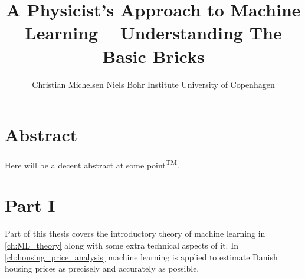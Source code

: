 \documentclass[a4paper, twoside, nobib]{tufte-book}
\title[A Physicist's Approach To Machine Learning -- Understanding The Basic Bricks]{A Physicist's \newline \noindent 
       Approach to \newline \noindent 
       Machine Learning \newline \noindent
       --  \newline \noindent
       Understanding  \newline \noindent
       The Basic Bricks}
\author[Christian Michelsen]{\newline \noindent 
        Christian Michelsen \newline \noindent 
        Niels Bohr Institute \newline \noindent 
        University of Copenhagen \newline }
\newcommand{\RNum}[1]{\uppercase\expandafter{\romannumeral #1\relax}}
\begin{document}
\begin{titlepage}
  
\end{titlepage}



\chapter*{Abstract}
Here will be a decent abstract at some point\textsuperscript{TM}.


\cleardoublepage
{}
{}

\tableofcontents

\cleardoublepage





\mainmatter




\chapter*{Part I}

Part \RNum{1} of this thesis covers the introductory theory of machine learning in \autoref{ch:ML_theory} along with some extra technical aspects of it. In \autoref{ch:housing_price_analysis} machine learning is applied to estimate Danish housing prices as precisely and accurately as possible.  


\end{document}
